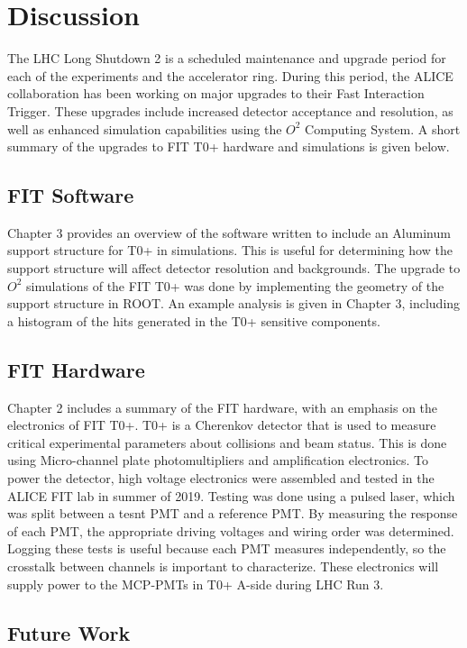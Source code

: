 \chapter{Discussion}
The LHC Long Shutdown 2 is a scheduled maintenance and upgrade period for each of the experiments and the accelerator ring. During this period, the ALICE collaboration has been working on major upgrades to their Fast Interaction Trigger. These upgrades include increased detector acceptance and resolution, as well as enhanced simulation capabilities using the $O^2$ Computing System. A short summary of the upgrades to FIT T0+ hardware and simulations is given below.


\section{FIT Software}
Chapter 3 provides an overview of the software written to include an Aluminum support structure for T0+ in simulations. This is useful for determining how the support structure will affect detector resolution and backgrounds. The upgrade to $O^2$ simulations of the FIT T0+ was done by implementing the geometry of the support structure in ROOT. An example analysis is given in Chapter 3, including a histogram of the hits generated in the T0+ sensitive components.

\section{FIT Hardware}
Chapter 2 includes a summary of the FIT hardware, with an emphasis on the electronics of FIT T0+. T0+ is a Cherenkov detector that is used to measure critical experimental parameters about collisions and beam status. This is done using Micro-channel plate photomultipliers and amplification electronics. To power the detector, high voltage electronics were assembled and tested in the ALICE FIT lab in summer of 2019. Testing was done using a pulsed laser, which was split between a tesnt PMT and a reference PMT. By measuring the response of each PMT, the appropriate driving voltages and wiring order was determined. Logging these tests is useful because each PMT measures independently, so the crosstalk between channels is important to characterize.  These electronics will supply power to the MCP-PMTs in T0+ A-side during LHC Run 3. 


\section{Future Work}

